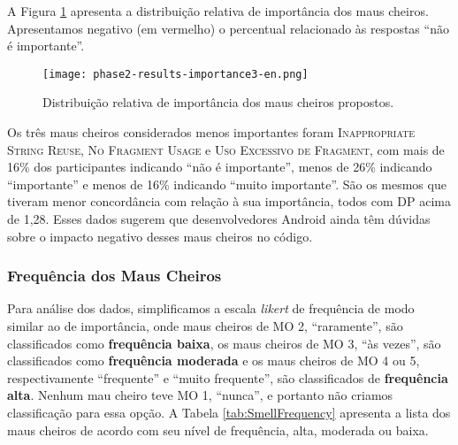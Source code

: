 A Figura \ref{fig:phase2-results-importance} apresenta a distribuição relativa de importância dos maus cheiros. Apresentamos negativo (em vermelho) o percentual relacionado às respostas ``não é importante''.

\begin{figure}
  \centering
  \texttt{[image: phase2-results-importance3-en.png]}
  \caption{Distribuição relativa de importância dos maus cheiros propostos.}
  \label{fig:phase2-results-importance}
\end{figure}

Os três maus cheiros considerados menos importantes foram \textsc{\small Inappropriate String Reuse}, \textsc{\small No Fragment Usage} e \textsc{\small Uso Excessivo de Fragment}, com mais de 16\% dos participantes indicando ``não é importante'', menos de 26\% indicando ``importante'' e menos de 16\% indicando ``muito importante''. São os mesmos que tiveram menor concordância com relação à sua importância, todos com DP acima de 1,28. Esses dados sugerem que desenvolvedores Android ainda têm dúvidas sobre o impacto negativo desses maus cheiros no código.


\subsubsection{Frequência dos Maus Cheiros}

Para análise dos dados, simplificamos a escala \textit{likert} de frequência de modo similar ao de importância, onde maus cheiros de MO 2, ``raramente'', são classificados como \textbf{\small frequência baixa}, os maus cheiros de MO 3, ``às vezes'', são classificados como \textbf{\small frequência moderada} e os maus cheiros de MO 4 ou 5, respectivamente ``frequente'' e ``muito frequente'', são classificados de \textbf{\small frequência alta}. Nenhum mau cheiro teve MO 1, ``nunca'', e portanto não criamos classificação para essa opção. A Tabela \ref{tab:SmellFrequency} apresenta a lista dos maus cheiros de acordo com seu nível de frequência, alta, moderada ou baixa.

